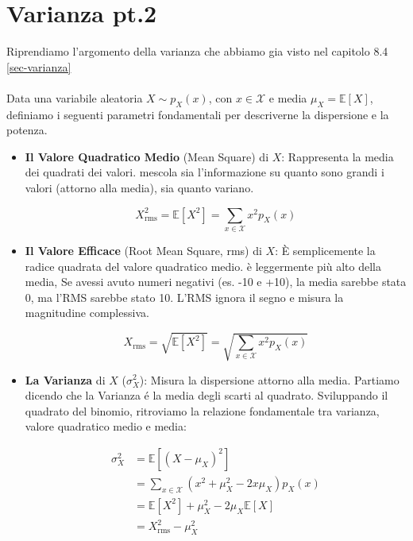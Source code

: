 \newpage
\section{Varianza pt.2}
Riprendiamo l'argomento della varianza che abbiamo gia visto nel capitolo 8.4 \ref{sec-varianza}
\\\\Data una variabile aleatoria $X \sim p_X(x)$, con $x \in \mathcal{X}$ e media $\mu_X = \mathbb{E}[X]$, definiamo i seguenti parametri fondamentali per descriverne la dispersione e la potenza.

\begin{itemize}
    \item \textbf{Il Valore Quadratico Medio} (Mean Square) di $X$:
    Rappresenta la media dei quadrati dei valori. mescola sia l'informazione su quanto sono grandi i valori (attorno alla media), sia quanto variano.
    
    \begin{equation}
    \boxed{X^2_{\text{rms}} = \mathbb{E}[X^2] = \sum_{x \in \mathcal{X}} x^2 p_X(x)}
    \end{equation}

    \item \textbf{Il Valore Efficace} (Root Mean Square, rms) di $X$:
    È semplicemente la radice quadrata del valore quadratico medio. è leggermente più alto della media, Se avessi avuto numeri negativi (es. -10 e +10), la media sarebbe stata 0, ma l'RMS sarebbe stato 10. L'RMS ignora il segno e misura la magnitudine complessiva.
    
    \begin{equation}
    X_{\text{rms}} = \sqrt{\mathbb{E}[X^2]} = \sqrt{\sum_{x \in \mathcal{X}} x^2 p_X(x)}
    \end{equation}

    \item \textbf{La Varianza} di $X$ ($\sigma_X^2$):
    Misura la dispersione attorno alla media. Partiamo dicendo che la Varianza é la media degli scarti al quadrato. Sviluppando il quadrato del binomio, ritroviamo la relazione fondamentale tra varianza, valore quadratico medio e media:

    \begin{equation}
    \begin{aligned}
    \sigma_X^2 &= \mathbb{E}\left[ (X - \mu_X)^2 \right] \\
    &= \sum_{x \in \mathcal{X}} (x^2 + \mu_X^2 - 2x\mu_X) p_X(x) \\
    &= \mathbb{E}[X^2] + \mu_X^2 - 2\mu_X\mathbb{E}[X] \\
    &= X^2_{\text{rms}} - \mu_X^2
    \end{aligned}
    \end{equation}
    

\end{itemize}
